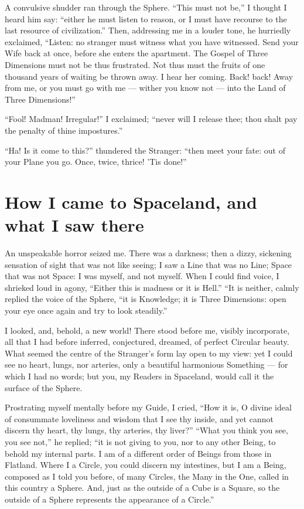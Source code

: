 \documentclass[12pt, a4paper, oneside]{memoir}
\begin{document}
A convulsive shudder ran through the Sphere. ``This must not be,'' I thought I
heard him say: ``either he must listen to reason, or I must have recourse to
the last resource of civilization.'' Then, addressing me in a louder tone, he
hurriedly exclaimed, ``Listen: no stranger must witness what you have
witnessed. Send your Wife back at once, before she enters the apartment. The
Gospel of Three Dimensions must not be thus frustrated. Not thus must the
fruits of one thousand years of waiting be thrown away. I hear her coming.
Back! back! Away from me, or you must go with me --- wither you know not --- into
the Land of Three Dimensions!''

``Fool! Madman! Irregular!'' I exclaimed; ``never will I release thee; thou shalt
pay the penalty of thine impostures.''

``Ha! Is it come to this?'' thundered the Stranger: ``then meet your fate: out of
your Plane you go. Once, twice, thrice! 'Tis done!''



\chapter{How I came to Spaceland, and what I saw there}
An unspeakable horror seized me. There was a darkness; then a dizzy, sickening
sensation of sight that was not like seeing; I saw a Line that was no Line;
Space that was not Space: I was myself, and not myself. When I could find
voice, I shrieked loud in agony, ``Either this is madness or it is Hell.'' ``It
is neither, calmly replied the voice of the Sphere, ``it is Knowledge; it is
Three Dimensions: open your eye once again and try to look steadily.''

I looked, and, behold, a new world! There stood before me, visibly
incorporate, all that I had before inferred, conjectured, dreamed, of perfect
Circular beauty. What seemed the centre of the Stranger's form lay open to my
view: yet I could see no heart, lungs, nor arteries, only a beautiful
harmonious Something --- for which I had no words; but you, my Readers in
Spaceland, would call it the surface of the Sphere.

Prostrating myself mentally before my Guide, I cried, ``How it is, O divine
ideal of consummate loveliness and wisdom that I see thy inside, and yet
cannot discern thy heart, thy lungs, thy arteries, thy liver?'' ``What you think
you see, you see not,'' he replied; ``it is not giving to you, nor to any other
Being, to behold my internal parts. I am of a different order of Beings from
those in Flatland. Where I a Circle, you could discern my intestines, but I am
a Being, composed as I told you before, of many Circles, the Many in the One,
called in this country a Sphere. And, just as the outside of a Cube is a
Square, so the outside of a Sphere represents the appearance of a Circle.''
\end{document}
